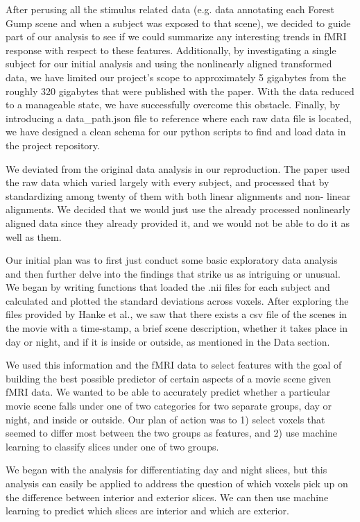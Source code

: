 \documentclass[11pt]{article}
\begin{document}
After perusing all the stimulus related data
(e.g. data annotating each Forest Gump scene and when a subject was exposed to
that scene), we decided to guide part of our analysis to see if we could
summarize any interesting trends in fMRI response with respect to these
features. Additionally, by investigating a single subject for our initial
analysis  and using the nonlinearly aligned transformed data, we have limited
our project’s scope to approximately 5 gigabytes from the roughly 320
gigabytes that were published with the paper. With the data reduced to a
manageable state, we have successfully overcome this obstacle. Finally, by
introducing a data\_path.json file to reference where each raw data file is
located, we have designed a clean schema for our python scripts to find and
load data in the project repository.

We deviated from the original data analysis in our reproduction. The paper
used the raw data which varied largely with every subject, and processed that
by standardizing among twenty of them with both linear alignments and non-
linear alignments. We decided that we would just use the already processed
nonlinearly aligned data since they already provided it, and we would not be
able to do it as well as them.

Our initial plan was to first just conduct some basic exploratory data
analysis and then further delve into the findings that strike us as intriguing
or unusual. We began by writing functions that loaded the .nii files for each
subject and calculated and plotted the standard deviations across voxels.
After exploring the files provided by Hanke et al., we saw that there exists a
csv file of the scenes in the movie with a time-stamp, a brief scene
description, whether it takes place in day or night, and if it is inside or
outside, as mentioned in the Data section.

We used this information and the fMRI data to select features with the goal of
building the best possible predictor of certain aspects of a movie scene given
fMRI data. We wanted to be able to accurately predict whether a particular
movie scene falls under one of two categories for two separate groups, day or
night, and inside or outside.  Our plan of action was to 1) select voxels that
seemed to differ most between the two groups as features, and 2) use machine
learning to classify slices under one of two groups.

We began with the analysis for differentiating day and night slices, but this
analysis can easily be applied to address the question of which voxels pick up
on the difference between interior and exterior slices.  We can then use
machine learning to predict which slices are interior and which are exterior.
\end{document}
